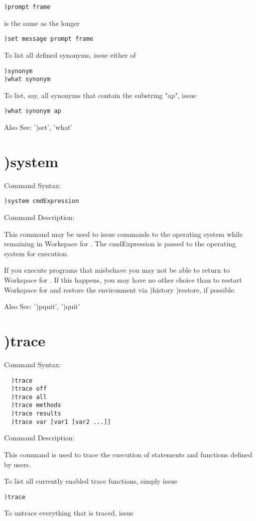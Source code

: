 \begin{verbatim}
)prompt frame
\end{verbatim}
is the same as the longer

\begin{verbatim}
)set message prompt frame
\end{verbatim}
To list all defined synonyms, issue either of

\begin{verbatim}
)synonym
)what synonym
\end{verbatim}
To list, say, all synonyms that contain the substring "ap", issue

\begin{verbatim}
)what synonym ap
\end{verbatim}
Also See: ')set', 'what'

\section{)system}

Command Syntax:
\begin{verbatim}
)system cmdExpression
\end{verbatim}
Command Description:

This command may be used to issue commands to the operating system while remaining in Workspace for \nr{}. The cmdExpression is passed to the operating system for execution.

If you execute programs that misbehave you may not be able to return to Workspace for \nr{}. If this happens, you may have no other choice than to restart Workspace for \nr{} and restore the environment via )history )restore, if possible.

Also See: ')pquit', ')quit'

\section{)trace}

Command Syntax:
\begin{verbatim}
  )trace
  )trace off
  )trace all
  )trace methods
  )trace results
  )trace var [var1 [var2 ...]]
\end{verbatim}
Command Description:

This command is used to trace the execution of statements and functions defined by users.

To list all currently enabled trace functions, simply issue
\begin{verbatim}
)trace
\end{verbatim}
To untrace everything that is traced, issue

